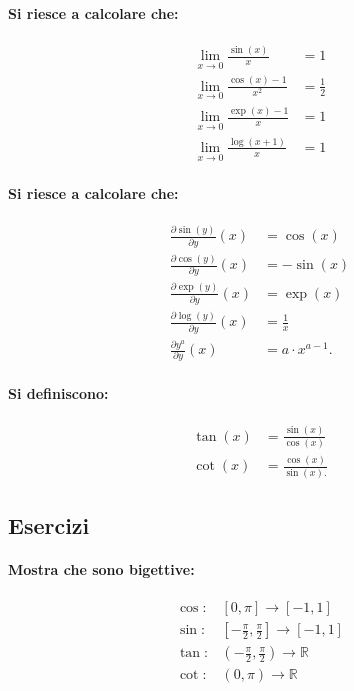 \documentclass{article}
\begin{document}
\paragraph{Si riesce a calcolare che:}

\begin{align*}
\lim_{x \rightarrow 0}\frac{\sin(x)}{x} &= 1\\
\lim_{x \rightarrow 0}\frac{\cos(x) - 1}{x^2} &= \frac{1}{2}\\
\lim_{x \rightarrow 0}\frac{\exp(x) - 1}{x} &= 1\\
\lim_{x \rightarrow 0}\frac{\log(x + 1)}{x} &= 1
\end{align*}

\paragraph{Si riesce a calcolare che:}

\begin{align*}
\frac{\partial \sin(y)}{\partial y}(x) &= \cos(x)\\
\frac{\partial \cos(y)}{\partial y}(x) &= - \sin(x)\\
\frac{\partial \exp(y)}{\partial y}(x) &= \exp(x)\\
\frac{\partial \log(y)}{\partial y}(x) &= \frac{1}{x}\\
\frac{\partial y^a}{\partial y}(x) &= a \cdot x^{a - 1}.
\end{align*}

\paragraph{Si definiscono:}

\begin{align*}
\tan(x) &= \frac{\sin(x)}{\cos(x)}\\
\cot(x) &= \frac{\cos(x)}{\sin(x).}
\end{align*}

\subsection*{Esercizi}

\paragraph{Mostra che sono bigettive:}

\begin{align*}
\cos:& [0, \pi] \rightarrow [- 1, 1]\\
\sin:& \left[- \frac{\pi}{2}, \frac{\pi}{2}\right] \rightarrow [- 1, 1]\\
\tan:& \left(- \frac{\pi}{2}, \frac{\pi}{2}\right) \rightarrow {\mathbb R}\\
\cot:& (0, \pi) \rightarrow {\mathbb R}
\end{align*}
\end{document}
